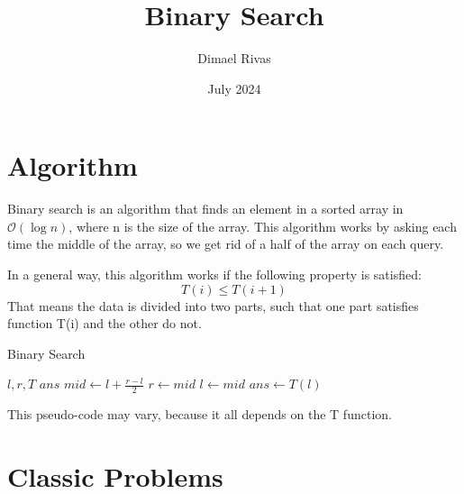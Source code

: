 \documentclass{article}
\title{Binary Search}
\author{Dimael Rivas}
\date{July 2024}
\begin{document}
	
	\maketitle
	
	\section{Algorithm}
	Binary search is an algorithm that finds an element in a sorted array in $\mathcal{O}(\log{}n)$, where n is the size of the array. This algorithm works by asking each time the middle of the array, so we get rid of a half of the array on each query.
	
	In a general way, this algorithm works if the following property is satisfied:
	$$T(i) \leq T(i+1)$$
	That means the data is divided into two parts, such that one part satisfies function T(i) and the other do not.
	
	\begin{algorithm}
		\caption{Binary Search}
		\begin{algorithmic}[0]
			\Require $l, r, T$
			\Ensure $ans$
			\State $mid \gets l + \frac{r-l}{2}$
			\State $r \gets mid$
			\Else
			\State $l \gets mid$
			\EndIf
			\EndWhile
			\State $ans \gets T(l)$
		\end{algorithmic}
	\end{algorithm}
	This pseudo-code may vary, because it all depends on the T function.
	\section{Classic Problems}
	
\end{document}
